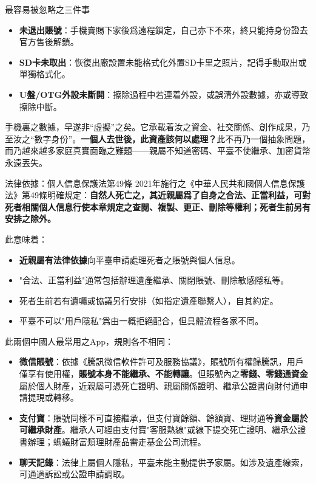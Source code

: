 \begin{tcbwarn}{最容易被忽略之三件事}
\begin{itemize}
  \item \textbf{未退出賬號}：手機賣賜下家後爲遠程鎖定，自己亦下不來，終只能持身份證去官方售後解鎖。
  \item \textbf{SD卡未取出}：恢復出廠設置未能格式化外置SD卡里之照片，記得手動取出或單獨格式化。
  \item \textbf{U盤/OTG外設未斷開}：擦除過程中若連着外設，或誤清外設數據，亦或導致擦除中斷。
\end{itemize}

\end{tcbwarn}


手機裏之數據，早遂非“虛擬”之矣。它承載着汝之資金、社交關係、創作成果，乃至汝之“數字身份”。\textbf{一個人去世後，此資產該何以處理？}此不再乃一個抽象問題，而乃越來越多家庭真實面臨之難題——親屬不知道密碼、平臺不使繼承、加密貨幣永遠丟失。

\begin{tcbinfo}{法律依據：個人信息保護法第49條}
2021年施行之《中華人民共和國個人信息保護法》第49條明確規定：\textbf{自然人死亡之，其近親屬爲了自身之合法、正當利益，可對死者相關個人信息行使本章規定之查閱、複製、更正、刪除等權利；死者生前另有安排之除外。}

此意味着：

\begin{itemize}
  \item \textbf{近親屬有法律依據}向平臺申請處理死者之賬號與個人信息。
  \item "合法、正當利益"通常包括辦理遺產繼承、關閉賬號、刪除敏感隱私等。
  \item 死者生前若有遺囑或協議另行安排（如指定遺產聯繫人），自其約定。
  \item 平臺不可以"用戶隱私"爲由一概拒絕配合，但具體流程各家不同。
\end{itemize}

\end{tcbinfo}


此兩個中國人最常用之App，規則各不相同：

\begin{itemize}
  \item \textbf{微信賬號}：依據《騰訊微信軟件許可及服務協議》，賬號所有權歸騰訊，用戶僅享有使用權，\textbf{賬號本身不能繼承、不能轉讓}。但賬號內之\textbf{零錢、零錢通資金}屬於個人財產，近親屬可憑死亡證明、親屬關係證明、繼承公證書向財付通申請提現或轉移。
  \item \textbf{支付寶}：賬號同樣不可直接繼承，但支付寶餘額、餘額寶、理財通等\textbf{資金屬於可繼承財產}。繼承人可經由支付寶"客服熱線"或線下提交死亡證明、繼承公證書辦理；螞蟻財富類理財產品需走基金公司流程。
  \item \textbf{聊天記錄}：法律上屬個人隱私，平臺未能主動提供予家屬。如涉及遺產線索，可通過訴訟或公證申請調取。
\end{itemize}

